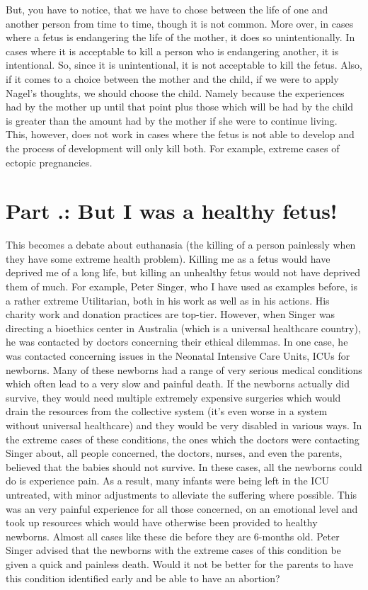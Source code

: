 But, you have to notice, that we have to chose between the life of one and another person from time to time, though it is not common. More over, in cases where a fetus is endangering the life of the mother, it does so unintentionally. In cases where it is acceptable to kill a person who is endangering another, it is intentional. So, since it is unintentional, it is not acceptable to kill the fetus. Also, if it comes to a choice between the mother and the child, if we were to apply Nagel’s thoughts, we should choose the child. Namely because the experiences had by the mother up until that point plus those which will be had by the child is greater than the amount had by the mother if she were to continue living. This, however, does not work in cases where the fetus is not able to develop and the process of development will only kill both. For example, extreme cases of ectopic pregnancies. 
\section{Part \thechapcount.\theseccount: But I was a healthy fetus!}

This becomes a debate about euthanasia (the killing of a person painlessly when they have some extreme health problem). Killing me as a fetus would have deprived me of a long life, but killing an unhealthy fetus would not have deprived them of much. For example, Peter Singer, who I have used as examples before, is a rather extreme Utilitarian, both in his work as well as in his actions. His charity work and donation practices are top-tier. However, when Singer was directing a bioethics center in Australia (which is a universal healthcare country), he was contacted by doctors concerning their ethical dilemmas. In one case, he was contacted concerning issues in the Neonatal Intensive Care Units, ICUs for newborns.  Many of these newborns had a range of very serious medical conditions which often lead to a very slow and painful death. If the newborns actually did survive, they would need multiple extremely expensive surgeries which would drain the resources from the collective system (it's even worse in a system without universal healthcare) and they would be very disabled in various ways. In the extreme cases of these conditions, the ones which the doctors were contacting Singer about, all people concerned, the  doctors, nurses, and even the parents, believed that the babies should not survive. In these cases, all the newborns could do is experience pain. As a result, many infants were being left in the ICU untreated, with minor adjustments to alleviate the suffering where possible.  This was an very painful experience for all those concerned, on an emotional level and took up resources which would have otherwise been provided to healthy newborns. Almost all cases like these die before they are 6-months old.  Peter Singer advised that the newborns with the extreme cases of this condition be given a quick and painless death. Would it not be better for the parents to have this condition identified early and be able to have an abortion?  
